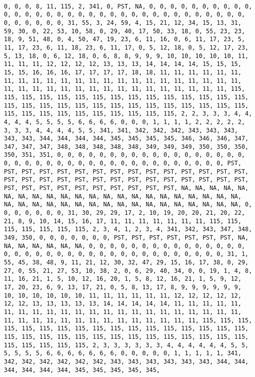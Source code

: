 \documentclass[]{article}
\begin{document}
\begin{verbatim}
                                                                                                                                                                                                                                0, 0, 0, 8, 11, 115, 2, 341, 0, PST, NA, 0, 0, 0, 0, 0, 0, 0, 0, 0, 0, 0, 0, 0, 0, 0, 0, 0, 0, 0, 0, 0, 0, 0, 0, 0, 0, 0, 0, 0, 0, 0, 0, 0, 0, 0, 0, 0, 0, 0, 31, 55, 3, 24, 59, 4, 15, 21, 12, 34, 15, 13, 31, 59, 30, 0, 22, 53, 10, 58, 0, 29, 40, 17, 50, 33, 18, 0, 55, 23, 23, 18, 9, 51, 48, 0, 4, 50, 47, 19, 23, 6, 11, 16, 0, 6, 11, 17, 23, 5, 11, 17, 23, 6, 11, 18, 23, 6, 11, 17, 0, 5, 12, 18, 0, 5, 12, 17, 23, 5, 13, 18, 0, 6, 12, 18, 0, 6, 8, 8, 9, 9, 9, 10, 10, 10, 10, 10, 11, 11, 11, 11, 12, 12, 12, 12, 13, 13, 13, 14, 14, 14, 14, 15, 15, 15, 15, 15, 16, 16, 16, 17, 17, 17, 17, 18, 18, 11, 11, 11, 11, 11, 11, 11, 11, 11, 11, 11, 11, 11, 11, 11, 11, 11, 11, 11, 11, 11, 11, 11, 11, 11, 11, 11, 11, 11, 11, 11, 11, 11, 11, 11, 11, 11, 11, 11, 115, 115, 115, 115, 115, 115, 115, 115, 115, 115, 115, 115, 115, 115, 115, 115, 115, 115, 115, 115, 115, 115, 115, 115, 115, 115, 115, 115, 115, 115, 115, 115, 115, 115, 115, 115, 115, 115, 115, 2, 2, 3, 3, 3, 4, 4, 4, 4, 4, 5, 5, 5, 5, 6, 6, 6, 6, 0, 0, 0, 1, 1, 1, 1, 2, 2, 2, 2, 2, 3, 3, 3, 4, 4, 4, 4, 5, 5, 341, 341, 342, 342, 342, 343, 343, 343, 343, 343, 344, 344, 344, 344, 345, 345, 345, 345, 346, 346, 346, 347, 347, 347, 347, 348, 348, 348, 348, 348, 349, 349, 349, 350, 350, 350, 350, 351, 351, 0, 0, 0, 0, 0, 0, 0, 0, 0, 0, 0, 0, 0, 0, 0, 0, 0, 0, 0, 0, 0, 0, 0, 0, 0, 0, 0, 0, 0, 0, 0, 0, 0, 0, 0, 0, 0, 0, 0, PST, PST, PST, PST, PST, PST, PST, PST, PST, PST, PST, PST, PST, PST, PST, PST, PST, PST, PST, PST, PST, PST, PST, PST, PST, PST, PST, PST, PST, PST, PST, PST, PST, PST, PST, PST, PST, PST, PST, NA, NA, NA, NA, NA, NA, NA, NA, NA, NA, NA, NA, NA, NA, NA, NA, NA, NA, NA, NA, NA, NA, NA, NA, NA, NA, NA, NA, NA, NA, NA, NA, NA, NA, NA, NA, NA, NA, NA, 0, 0, 0, 0, 0, 0, 0, 31, 30, 29, 29, 17, 2, 10, 19, 20, 20, 21, 20, 22, 21, 8, 9, 10, 14, 15, 16, 17, 11, 11, 11, 11, 11, 11, 11, 115, 115, 115, 115, 115, 115, 115, 2, 3, 4, 1, 2, 3, 4, 341, 342, 343, 347, 348, 349, 350, 0, 0, 0, 0, 0, 0, 0, PST, PST, PST, PST, PST, PST, PST, NA, NA, NA, NA, NA, NA, NA, 0, 0, 0, 0, 0, 0, 0, 0, 0, 0, 0, 0, 0, 0, 0, 0, 0, 0, 0, 0, 0, 0, 0, 0, 0, 0, 0, 0, 0, 0, 0, 0, 0, 0, 0, 0, 31, 1, 55, 45, 38, 48, 9, 11, 21, 12, 30, 32, 47, 29, 15, 16, 17, 38, 0, 29, 27, 0, 55, 21, 27, 53, 10, 38, 2, 0, 6, 29, 40, 34, 0, 0, 19, 1, 4, 8, 11, 16, 21, 1, 5, 10, 12, 16, 20, 1, 5, 8, 12, 16, 21, 1, 5, 9, 12, 17, 20, 23, 6, 9, 13, 17, 21, 0, 5, 8, 13, 17, 8, 9, 9, 9, 9, 9, 9, 10, 10, 10, 10, 10, 10, 11, 11, 11, 11, 11, 11, 12, 12, 12, 12, 12, 12, 12, 13, 13, 13, 13, 13, 14, 14, 14, 14, 14, 11, 11, 11, 11, 11, 11, 11, 11, 11, 11, 11, 11, 11, 11, 11, 11, 11, 11, 11, 11, 11, 11, 11, 11, 11, 11, 11, 11, 11, 11, 11, 11, 11, 11, 11, 11, 115, 115, 115, 115, 115, 115, 115, 115, 115, 115, 115, 115, 115, 115, 115, 115, 115, 115, 115, 115, 115, 115, 115, 115, 115, 115, 115, 115, 115, 115, 115, 115, 115, 115, 115, 115, 2, 3, 3, 3, 3, 3, 3, 4, 4, 4, 4, 4, 4, 5, 5, 5, 5, 5, 5, 6, 6, 6, 6, 6, 6, 6, 0, 0, 0, 0, 0, 1, 1, 1, 1, 1, 341, 342, 342, 342, 342, 342, 342, 343, 343, 343, 343, 343, 343, 344, 344, 344, 344, 344, 344, 345, 345, 345, 345, 345, 
\end{verbatim}
\end{document}
